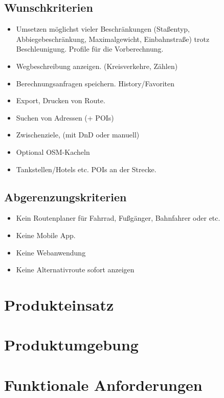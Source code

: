 \documentclass[a4paper, 11pt]{article}
\begin{document}
\subsection{Wunschkriterien}
\begin{itemize}
\item Umsetzen möglichst vieler Beschränkungen (Staßentyp, Abbiegebeschränkung, 
Maximalgewicht, Einbahnstraße) trotz Beschleunigung. Profile für die Vorberechnung.

\item Wegbeschreibung anzeigen. (Kreisverkehre, Zählen)
\item Berechnungsanfragen speichern. History/Favoriten
\item Export, Drucken von Route.

\item Suchen von Adressen (+ POIs)

\item Zwischenziele, (mit DnD oder manuell)
\item Optional OSM-Kacheln
\item Tankstellen/Hotels etc. POIs an der Strecke.
\end{itemize}
\subsection{Abgerenzungskriterien}

\begin{itemize}
\item Kein Routenplaner für Fahrrad, Fußgänger, Bahnfahrer oder etc.
\item Keine Mobile App.
\item Keine Webanwendung
\item Keine Alternativroute sofort anzeigen

\end{itemize}

\section{Produkteinsatz}
\section{Produktumgebung}
\section{Funktionale Anforderungen}
\end{document}
